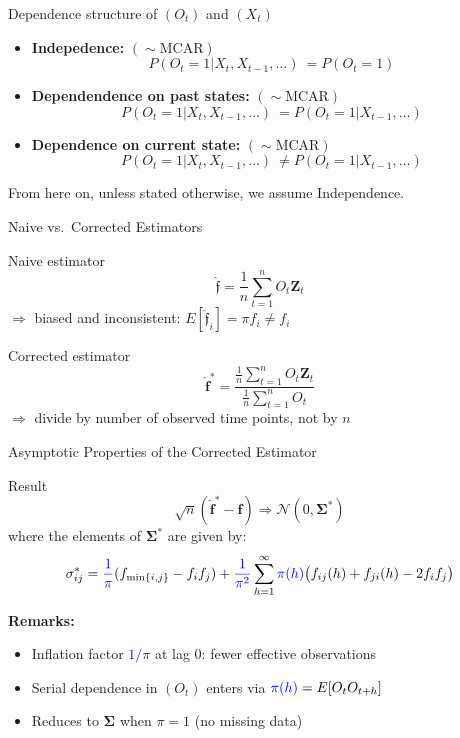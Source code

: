 \documentclass{beamer}
\begin{document}
\begin{frame}{Dependence structure of $(O_t)$ and $(X_t)$}
    \begin{itemize}  
        \item \textbf{Indepedence:} $(\sim\!\text{MCAR})$
        \[P(O_t = 1| X_t, X_{t-1}, \ldots)\ = P(O_t = 1)\]
        \item \textbf{Dependendence on past states:} $(\sim\!\text{MCAR})$
        \[P(O_t = 1| X_t, X_{t-1}, \ldots)\ = P(O_t = 1| X_{t-1}, \ldots)\]
        \item \textbf{Dependence on current state:} $(\sim\!\text{MCAR})$
        \[P(O_t = 1| X_t, X_{t-1}, \ldots)\ \neq P(O_t = 1| X_{t-1}, \ldots)\]
    \end{itemize}
    From here on, unless stated otherwise, we assume Independence.
\end{frame}

\begin{frame}{Naive vs.\ Corrected Estimators}
    \begin{block}{Naive estimator}
        \[\hat{\boldsymbol{\mathfrak{f}}} = \frac{1}{n} \sum_{t=1}^n O_t \boldsymbol{Z}_t\]
        $\Rightarrow$ biased and inconsistent: $E[\hat{\mathfrak{f}}_i] = \pi f_i \neq f_i$
    \end{block}
    \begin{block}{Corrected estimator}
        \[\hat{\boldsymbol{f}}^* = \frac{\frac{1}{n}\sum_{t=1}^n O_t \boldsymbol{Z}_t}{\frac{1}{n}\sum_{t=1}^n O_t}\]
        $\Rightarrow$ divide by number of observed time points, not by $n$
    \end{block}
\end{frame}

\begin{frame}{Asymptotic Properties of the Corrected Estimator}
    \begin{block}{Result}
        \[\sqrt{n}(\hat{\boldsymbol{f}}^* - \boldsymbol{f}) \Rightarrow \mathcal{N}(0, \boldsymbol{\Sigma}^*)\]
        where the elements of $\boldsymbol{\Sigma}^*$ are given by:
        \[
            \sigma^*_{ij} =
            \textcolor{blue}{\frac{1}{\pi}} (f_{\mathrm{min}\{i,j\}} - f_i f_j)
            +
            \textcolor{blue}{\frac{1}{\pi^2}} 
            \sum_{h = 1}^{\infty} 
            \textcolor{blue}{\pi(h)}
            \bigl(f_{ij}(h) + f_{ji}(h) - 2f_i f_j\bigr)
        \]
    \end{block}

    \vspace{0.3cm}
    \textbf{Remarks:}
    \begin{itemize}
        \item Inflation factor \textcolor{blue}{$1/\pi$} at lag 0: fewer effective observations
        \item Serial dependence in $(O_t)$ enters via $\textcolor{blue}{\pi(h)} = E[O_t O_{t+h}]$
        \item Reduces to $\boldsymbol{\Sigma}$ when $\pi = 1$ (no missing data)
    \end{itemize}
\end{frame}
\end{document}
